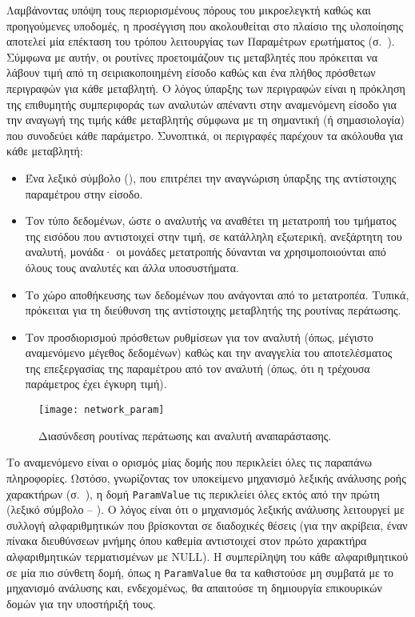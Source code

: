 Λαμβάνοντας υπόψη τους περιορισμένους πόρους του μικροελεγκτή καθώς και
προηγούμενες υποδομές, η προσέγγιση που ακολουθείται στο πλαίσιο της υλοποίησης
αποτελεί μία επέκταση του τρόπου λειτουργίας των Παραμέτρων ερωτήματος
(σ.~\pageref{ssubsec:network:query-string}). Σύμφωνα με αυτήν, οι ρουτίνες
προετοιμάζουν τις μεταβλητές που πρόκειται να λάβουν τιμή από τη
σειριακοποιημένη είσοδο καθώς και ένα πλήθος πρόσθετων περιγραφών για κάθε
μεταβλητή. Ο λόγος ύπαρξης των περιγραφών είναι η πρόκληση της επιθυμητής
συμπεριφοράς των αναλυτών απέναντι στην αναμενόμενη είσοδο για την αναγωγή της
τιμής κάθε μεταβλητής σύμφωνα με τη σημαντική (ή σημασιολογία) που συνοδεύει
κάθε παράμετρο. Συνοπτικά, οι περιγραφές παρέχουν τα ακόλουθα για κάθε
μεταβλητή:
\begin{itemize}
    \item Ένα λεξικό σύμβολο (), που επιτρέπει την αναγνώριση ύπαρξης
    της αντίστοιχης παραμέτρου στην είσοδο.

    \item Τον τύπο δεδομένων, ώστε ο αναλυτής να αναθέτει τη μετατροπή του
    τμήματος της εισόδου που αντιστοιχεί στην τιμή, σε κατάλληλη εξωτερική,
    ανεξάρτητη του αναλυτή, μονάδα· οι μονάδες μετατροπής δύνανται να
    χρησιμοποιούνται από όλους τους αναλυτές και άλλα υποσυστήματα.

    \item Το χώρο αποθήκευσης των δεδομένων που ανάγονται από το μετατροπέα.
    Τυπικά, πρόκειται για τη διεύθυνση της αντίστοιχης μεταβλητής της ρουτίνας
    περάτωσης.

    \item Τον προσδιορισμού πρόσθετων ρυθμίσεων για τον αναλυτή (όπως, μέγιστο
    αναμενόμενο μέγεθος δεδομένων) καθώς και την αναγγελία του αποτελέσματος της
    επεξεργασίας της παραμέτρου από τον αναλυτή (όπως, ότι η τρέχουσα παράμετρος
    έχει έγκυρη τιμή).
\end{itemize}

\begin{figure}
    \caption{Διασύνδεση ρουτίνας περάτωσης και αναλυτή αναπαράστασης.
    \label{fig:network:param}}
    \begin{center}
    \texttt{[image: network\_param]}
    \end{center}
\end{figure}

Το αναμενόμενο είναι ο ορισμός μίας δομής που περικλείει όλες τις παραπάνω
πληροφορίες. Ωστόσο, γνωρίζοντας τον υποκείμενο μηχανισμό λεξικής ανάλυσης ροής
χαρακτήρων (σ.~\pageref{ssubsec:network:stream-match}), η δομή \verb~ParamValue~
τις περικλείει όλες εκτός από την πρώτη (λεξικό σύμβολο -- ). Ο λόγος
είναι ότι ο μηχανισμός λεξικής ανάλυσης λειτουργεί με συλλογή αλφαριθμητικών που
βρίσκονται σε διαδοχικές θέσεις (για την ακρίβεια, έναν πίνακα διευθύνσεων
μνήμης όπου καθεμία αντιστοιχεί στον πρώτο χαρακτήρα αλφαριθμητικών
τερματισμένων με NULL). Η συμπερίληψη του κάθε αλφαριθμητικού σε μία πιο σύνθετη
δομή, όπως η \verb~ParamValue~ θα τα καθιστούσε μη συμβατά με το μηχανισμό
ανάλυσης και, ενδεχομένως, θα απαιτούσε τη δημιουργία επικουρικών δομών για την
υποστήριξή τους.

